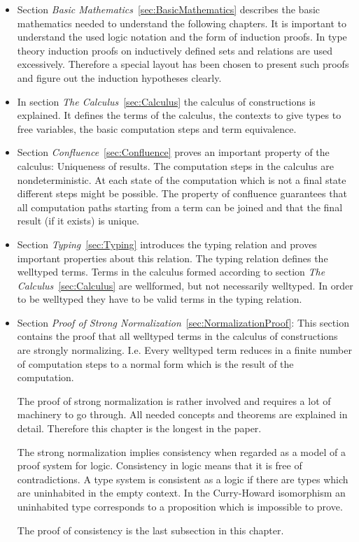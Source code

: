 \begin{itemize}

\item Section \emph{Basic Mathematics}~\ref{sec:BasicMathematics} describes the
basic mathematics needed to understand the following chapters. It is important
to understand the used logic notation and the form of induction proofs. In type
theory induction proofs on inductively defined sets and relations are used
excessively. Therefore a special layout has been chosen to present such proofs
and figure out the induction hypotheses clearly.

\item In section \emph{The Calculus}~\ref{sec:Calculus} the calculus of
constructions is explained. It defines the terms of the calculus, the contexts
to give types to free variables, the basic computation steps and term
equivalence.


\item Section \emph{Confluence}~\ref{sec:Confluence} proves an important
property of the calculus: Uniqueness of results. The computation steps in the
calculus are nondeterministic. At each state of the computation which is not a
final state different steps might be possible. The property of confluence
guarantees that all computation paths starting from a term can be joined and
that the final result (if it exists) is unique.

\item Section \emph{Typing}~\ref{sec:Typing} introduces the typing relation and
proves important properties about this relation. The typing relation defines the
welltyped terms. Terms in the calculus formed according to section \emph{The
Calculus}~\ref{sec:Calculus} are wellformed, but not necessarily welltyped. In
order to be welltyped they have to be valid terms in the typing relation.


\item Section \emph{Proof of Strong Normalization}~\ref{sec:NormalizationProof}:
This section contains the proof that all welltyped terms in the calculus of
constructions are strongly normalizing. I.e. Every welltyped term reduces in a
finite number of computation steps to a normal form which is the result of the
computation.

The proof of strong normalization is rather involved and requires a lot of
machinery to go through. All needed concepts and theorems are explained in
detail. Therefore this chapter is the longest in the paper.

The strong normalization implies consistency when regarded
as a model of a proof system for logic. Consistency in logic means that it is
free of contradictions. A type system is consistent as a logic if there are
types which are uninhabited in the empty context. In the Curry-Howard
isomorphism an uninhabited type corresponds to a proposition which is
impossible to prove.

The proof of consistency is the last subsection in this chapter.

\end{itemize}
